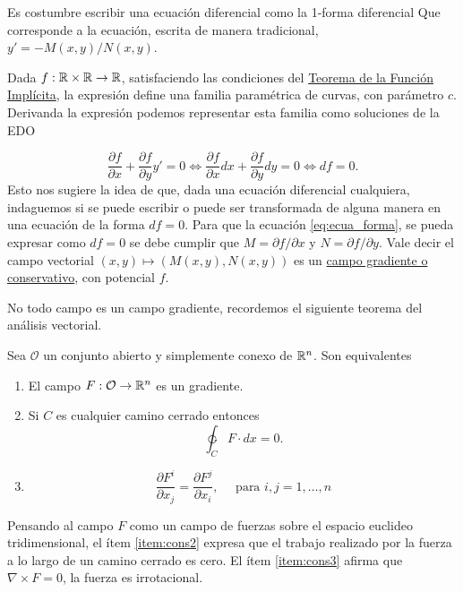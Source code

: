  Es costumbre escribir una ecuación diferencial  como la 1-forma diferencial
Que corresponde a la ecuación, escrita de manera tradicional, \linebreak$y'=-M(x,y)/N(x,y)$.



 Dada $f:\rr\times\rr\to\rr$, satisfaciendo las condiciones del \href{https://es.wikipedia.org/wiki/Teorema_de_la_funci%C3%B3n_impl%C3%ADcita}{Teorema de la Función Implícita}\link, la expresión
define una  familia paramétrica de curvas, con parámetro $c$. Derivanda la expresión podemos representar esta familia como soluciones de la EDO

\[
 \frac{\partial f}{\partial x}+\frac{\partial f}{\partial y}y'=0\Longleftrightarrow \frac{\partial f}{\partial x}dx+\frac{\partial f}{\partial y}dy=0
 \Longleftrightarrow df=0.
\]
 Esto nos sugiere la idea de que, dada una ecuación diferencial cualquiera, indaguemos si se puede escribir o puede ser transformada de alguna manera en una ecuación de la forma $df=0$.  Para que la ecuación \eqref{eq:ecua_forma}, se pueda expresar como $df=0$ se debe cumplir que  $M=\partial f/\partial x$ y $N=\partial f/\partial y$.
 Vale decir el campo vectorial $(x,y)\mapsto (M(x,y),N(x,y))$ es un \href{http://es.wikipedia.org/wiki/Fuerza_conservativa}{campo
gradiente o conservativo}\link, con potencial $f$.

No todo campo es un campo gradiente, recordemos el siguiente teorema del análisis vectorial.

 \begin{teorema}\label{teo:campo_cons} Sea $\mathcal{O}$ un conjunto abierto y simplemente conexo de $\rr^n$. Son equivalentes
 \begin{enumerate}
  \item\label{item:cons1} El campo $F:\mathcal{O}\to\rr^n$ es un gradiente.
  \item\label{item:cons2} Si $C$ es cualquier camino cerrado entonces
  \[\ointctrclockwise_C F\cdot d x=0.\]
  \item\label{item:cons3} \[\frac{\partial F^i}{\partial x_j}=\frac{\partial F^j}{\partial x_i},\quad\text{ para }i,j=1,\ldots,n\]
 \end{enumerate}

\end{teorema}

Pensando al campo $F$ como un campo de  fuerzas sobre el espacio euclideo tridimensional,  el ítem \ref{item:cons2} expresa que el trabajo realizado por la fuerza a lo largo de un camino cerrado es cero. El ítem \ref{item:cons3} afirma que $\nabla\times F=0$, la fuerza es irrotacional.


